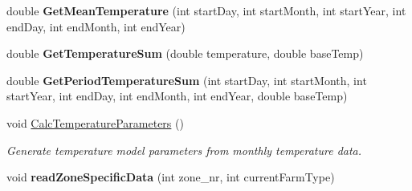 \begin{DoxyCompactItemize}
\item 
\mbox{\label{struct_global_vars_1_1zone_specific_data_a0b81c224c1cb9191f21487f0b1c45fd0}} 
double {\bfseries Get\+Mean\+Temperature} (int start\+Day, int start\+Month, int start\+Year, int end\+Day, int end\+Month, int end\+Year)
\item 
\mbox{\label{struct_global_vars_1_1zone_specific_data_a3a76a8cc114ee80915101d99b64188b2}} 
double {\bfseries Get\+Temperature\+Sum} (double temperature, double base\+Temp)
\item 
\mbox{\label{struct_global_vars_1_1zone_specific_data_ac2781331f31682c03135f853166c18f5}} 
double {\bfseries Get\+Period\+Temperature\+Sum} (int start\+Day, int start\+Month, int start\+Year, int end\+Day, int end\+Month, int end\+Year, double base\+Temp)
\item 
\mbox{\label{struct_global_vars_1_1zone_specific_data_a8ab3efd8e62fee5861270aae9d599a28}} 
void \mbox{\hyperlink{struct_global_vars_1_1zone_specific_data_a8ab3efd8e62fee5861270aae9d599a28}{Calc\+Temperature\+Parameters}} ()
\begin{DoxyCompactList}\small\item\em Generate temperature model parameters from monthly temperature data. \end{DoxyCompactList}\item 
\mbox{\label{struct_global_vars_1_1zone_specific_data_a8abd745cc132dff95df9a4f982f1071c}} 
void {\bfseries read\+Zone\+Specific\+Data} (int zone\+\_\+nr, int current\+Farm\+Type)
\end{DoxyCompactItemize}
